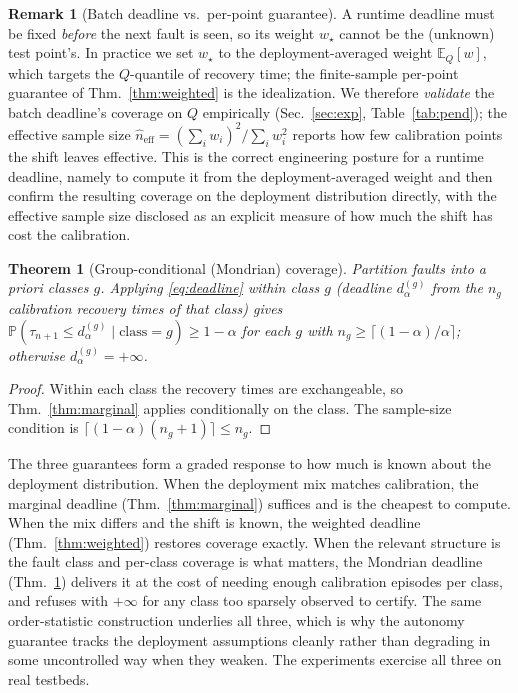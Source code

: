 \documentclass[journal]{IEEEtran}
\theoremstyle{plain}
\newtheorem{theorem}{Theorem}
\theoremstyle{definition}
\newtheorem{remark}{Remark}
\newcommand{\E}{\mathbb{E}}
\newcommand{\Prob}{\mathbb{P}}
\newcommand{\dalpha}{d_{\alpha}}
\begin{document}
\begin{remark}[Batch deadline vs.\ per-point guarantee]
\label{rem:batch}
A runtime deadline must be fixed \emph{before} the next fault is seen, so its weight
$w_\star$ cannot be the (unknown) test point's. In practice we set $w_\star$ to the
deployment-averaged weight $\E_Q[w]$, which targets the $Q$-quantile of recovery time; the
finite-sample per-point guarantee of Thm.~\ref{thm:weighted} is the idealization. We
therefore \emph{validate} the batch deadline's coverage on $Q$ empirically
(Sec.~\ref{sec:exp}, Table~\ref{tab:pend}); the effective sample size
$\widehat{n}_{\mathrm{eff}}=(\sum_i w_i)^2/\sum_i w_i^2$ reports how few calibration points
the shift leaves effective. This is the correct engineering posture for a runtime deadline,
namely to compute it from the deployment-averaged weight and then confirm the resulting
coverage on the deployment distribution directly, with the effective sample size disclosed as
an explicit measure of how much the shift has cost the calibration.
\end{remark}

\begin{theorem}[Group-conditional (Mondrian) coverage]
\label{thm:mondrian}
Partition faults into a priori classes $g$. Applying \eqref{eq:deadline} within class $g$
(deadline $\dalpha^{(g)}$ from the $n_g$ calibration recovery times of that class) gives
$\Prob(\tau_{n+1}\le \dalpha^{(g)}\mid \text{class}=g)\ge 1-\alpha$ for each $g$ with
$n_g\ge \lceil(1-\alpha)/\alpha\rceil$; otherwise $\dalpha^{(g)}=+\infty$.
\end{theorem}
\begin{proof}
Within each class the recovery times are exchangeable, so Thm.~\ref{thm:marginal} applies
conditionally on the class. The sample-size condition is $\lceil(1-\alpha)(n_g+1)\rceil\le
n_g$.
\end{proof}

The three guarantees form a graded response to how much is known about the deployment
distribution. When the deployment mix matches calibration, the marginal deadline
(Thm.~\ref{thm:marginal}) suffices and is the cheapest to compute. When the mix differs and
the shift is known, the weighted deadline (Thm.~\ref{thm:weighted}) restores coverage exactly.
When the relevant structure is the fault class and per-class coverage is what matters, the
Mondrian deadline (Thm.~\ref{thm:mondrian}) delivers it at the cost of needing enough
calibration episodes per class, and refuses with $+\infty$ for any class too sparsely
observed to certify. The same order-statistic construction underlies all three, which is why
the autonomy guarantee tracks the deployment assumptions cleanly rather than degrading in
some uncontrolled way when they weaken. The experiments exercise all three on real testbeds.
\end{document}
